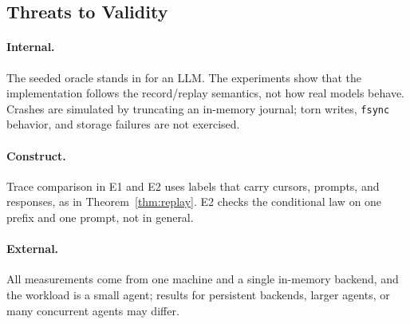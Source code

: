\subsection{Threats to Validity}
\label{sec:eval-threats}

\paragraph{Internal.}
The seeded oracle stands in for an LLM.
The experiments show that the implementation follows the record/replay semantics, not how real
models behave.
Crashes are simulated by truncating an in-memory journal; torn writes, \texttt{fsync} behavior,
and storage failures are not exercised.

\paragraph{Construct.}
Trace comparison in E1 and E2 uses labels that carry cursors, prompts, and responses, as in
Theorem~\ref{thm:replay}.
E2 checks the conditional law on one prefix and one prompt, not in general.

\paragraph{External.}
All measurements come from one machine and a single in-memory backend, and the workload is a
small agent; results for persistent backends, larger agents, or many concurrent agents may
differ.

\begin{table}[t]
\centering
\caption{Summary of the evaluation.}
\label{tab:eval-summary}
\end{table}
